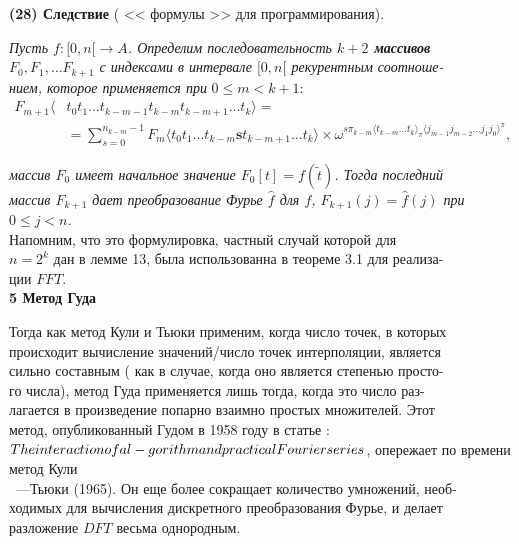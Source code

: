 \documentclass{mai_book}
\begin{document}
{\textbf{(28) Следствие} ( << формулы >> для программирования).

\indent\textit{Пусть $f: [0, n[ \longrightarrow A $. Определим последовательность \textbf{$k+2$ массивов}\\ $F_0, F_1, \ldots F_{k+1}$ с индексами в интервале $ [0, n[$ рекурентным соотноше-\\нием, которое применяется при} $0\leqslant m< k +1$:\\
\begin{align*}
F_{m+1}\langle &t_0t_1{\ldots}t_{k-m-1}t_{k-m}t_{k-m+1}{\ldots}t_k\rangle = \\
&=\sum_{s=0}^{n_{k-m}-1}F_m \langle t_0t_1{\ldots}t_{k-m}\textbf{s}t_{k-m+1}\ldots t_k\rangle \times
\omega^{{s\pi_{k-m}{\langle}t_{k-m}\ldots t_{k}\rangle}_\pi{\langle j_{m-1}j_{m-2}\ldots j_1j_0\rangle}^\pi},
\end{align*}
\newpage
{}
 
 \noindent\textit{массив $F_0$ имеет начальное значение $F_0[t]= f(\tilde{t})$. Тогда последний \\ массив $F_{k+1}$ дает преобразование Фурье $\hat{f}$ для $f$, $F_{k+1}(j)=\hat{f}(j)$ при \\ $0\leqslant j < n $.}\\
 \indent Напомним, что это формулировка, частный случай которой для \\ $n=2^k$ дан в лемме 13, была использованна в теореме 3.1 для реализа-\\ции \large{$F$}$FT$.\\
 
 \large{\textbf{5 Метод Гуда}}
 
 \medskip
 \normalsize Тогда как метод Кули и Тьюки применим, когда число точек, в которых \\ происходит вычисление значений/число точек интерполяции, является\\ сильно составным ( как в случае, когда оно является степенью просто-\\го числа), метод Гуда применяется лишь тогда, когда это число раз-\\лагается в произведение попарно взаимно простых множителей. Этот \\ метод, опубликованный Гудом в 1958 году в статье : $ The interaction of al-\\gorithm and practical Fourier series$, опережает по времени метод Кули \\ ~---Тьюки (1965). Он еще более сокращает количество умножений, необ-\\ходимых для вычисления дискретного преобразования Фурье, и делает \\ разложение \large{$D$}$FT$ \normalsize весьма однородным.\\
 
}
\end{document}
